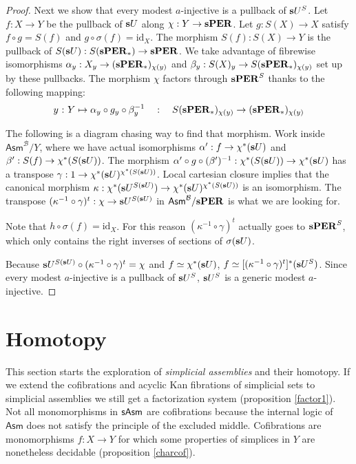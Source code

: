 \documentclass{amsart}
\theoremstyle{plain}
\theoremstyle{definition}
\newcommand\hide[1]{}
\newcommand\cat\mathcal
\newcommand\id{\mathrm{id}}
\newcommand\ri{^*}
\newcommand\Asm{\mathsf{Asm}}
\begin{document}
\begin{proof}
Next we show that every modest $a$-injective is a pullback of $\mathbf{s} U^S$.
Let $f:X\to Y$ be the pullback of $\mathbf{s} U$ along $\chi:Y\to \mathbf{s} \mathbf{PER}$. Let $g:S(X) \to X$ satisfy $f\circ g = S(f)$ and $g\circ \sigma(f) = \id_X$. The morphism $S(f):S(X)\to Y$ is the pullback of $S(\mathbf{s} U):S(\mathbf{s}\mathbf{PER}_*) \to \mathbf{s}\mathbf{PER}$. We take advantage of fibrewise isomorphisms $\alpha_y:X_y \to (\mathbf{s}\mathbf{PER}_*)_{\chi(y)}$ and $\beta_y:S(X)_y\to S(\mathbf{s}\mathbf{PER}_*)_{\chi(y)}$ set up by these pullbacks. The morphism $\chi$ factors through $\mathbf{s}\mathbf{PER}^S$ thanks to the following mapping: 
\[ y\mathord{\ :\ } Y  \mapsto \alpha_y\circ g_y\circ \beta_y^{-1}\quad:\quad S(\mathbf{s}\mathbf{PER}_*)_{\chi(y)}\to (\mathbf{s}\mathbf{PER}_*)_{\chi(y)} \]

\hide{generalized elements}
The following is a diagram chasing way to find that morphism.
Work inside $\Asm^{\cat B}/Y$, where we have actual isomorphisms $\alpha':f\to \chi\ri(\rat U)$ and $\beta':S(f)\to\chi\ri(S(\rat U))$. 
The morphism $\alpha'\circ g\circ (\beta')^{-1}:\chi\ri(S(\rat U)) \to \chi\ri(\rat U)$ has a transpose $\gamma:1\to \chi\ri(\rat U)^{\chi\ri(S(\rat U))}$. 
Local cartesian closure implies that the canonical morphism $\kappa:\chi\ri(\rat U^{S(\rat U)})\to \chi\ri(\rat U)^{\chi\ri(S(\rat U))}$ is an isomorphism.
The transpose $(\kappa^{-1}\circ\gamma)^t:\chi\to \mathbf{s} U^{S(\mathbf{s} U)}$ in $\Asm^{\cat B}/\rat\pers$ is what we are looking for.

Note that $h\circ \sigma(f) = \id_X$. For this reason $(\kappa^{-1}\circ\gamma)^t$ actually goes to $\mathbf{s}\mathbf{PER}^S$, which only contains the right inverses of sections of $\sigma(\mathbf{s} U)$.

\hide{Kunnen we vast aantonen met de juiste pullbacks, maar misschien gaat dat te ver.}

Because $\mathbf{s} U^{S(\mathbf{s} U)}\circ (\kappa^{-1}\circ\gamma)^t = \chi$ and $f\simeq \chi\ri(\rat U)$, $f\simeq [(\kappa^{-1}\circ\gamma)^t]\ri(\rat U^S)$. Since every modest $a$-injective is a pullback of $\mathbf{s} U^S$, $\mathbf{s} U^S$ is a generic modest $a$-injective.
\end{proof}

\section{Homotopy}
This section starts the exploration of \emph{simplicial assemblies} and their homotopy. If we extend the cofibrations and acyclic Kan fibrations of simplicial sets to simplicial assemblies we still get a factorization system (proposition \ref{factor1}). Not all monomorphisms in $\mathsf{sAsm}$ are cofibrations because the internal logic of $\Asm$ does not satisfy the principle of the excluded middle. Cofibrations are monomorphisms $f:X\to Y$ for which some properties of simplices in $Y$ are nonetheless decidable (proposition \ref{charcof}).
\end{document}

